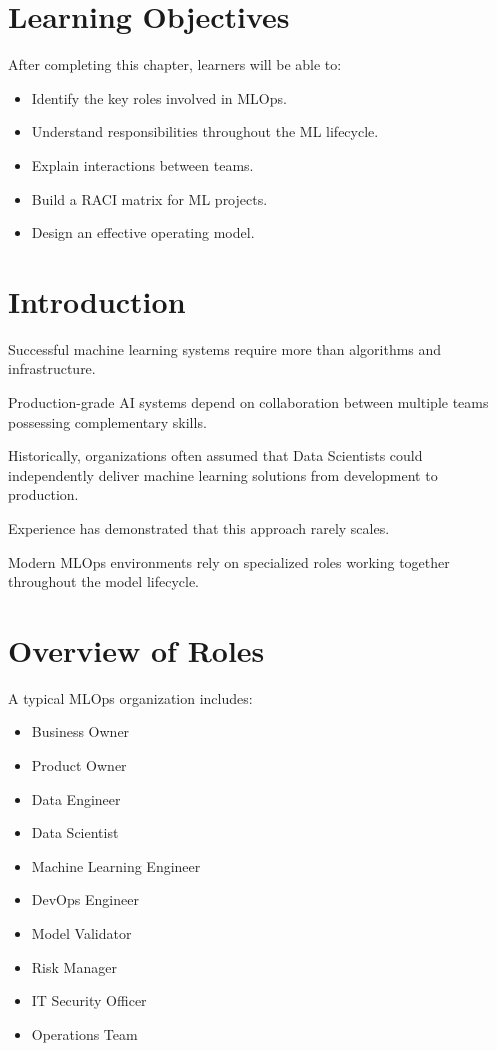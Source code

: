 
\label{chap:roles-responsibilities}

\section{Learning Objectives}

After completing this chapter, learners will be able to:

\begin{itemize}
    \item Identify the key roles involved in MLOps.
    \item Understand responsibilities throughout the ML lifecycle.
    \item Explain interactions between teams.
    \item Build a RACI matrix for ML projects.
    \item Design an effective operating model.
\end{itemize}

\section{Introduction}

Successful machine learning systems require more than algorithms and infrastructure.

Production-grade AI systems depend on collaboration between multiple teams possessing complementary skills.

Historically, organizations often assumed that Data Scientists could independently deliver machine learning solutions from development to production.

Experience has demonstrated that this approach rarely scales.

Modern MLOps environments rely on specialized roles working together throughout the model lifecycle.

\section{Overview of Roles}

A typical MLOps organization includes:

\begin{itemize}
    \item Business Owner
    \item Product Owner
    \item Data Engineer
    \item Data Scientist
    \item Machine Learning Engineer
    \item DevOps Engineer
    \item Model Validator
    \item Risk Manager
    \item IT Security Officer
    \item Operations Team
\end{itemize}

